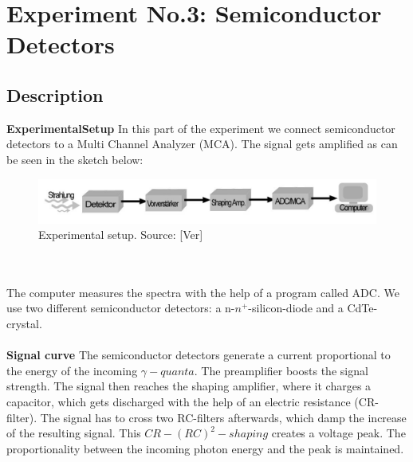 \chapter{Experiment No.3: Semiconductor Detectors}
\section{Description}
\textbf{ExperimentalSetup}
In this part of the experiment we connect semiconductor detectors to a Multi Channel Analyzer (MCA). The signal gets amplified as can be seen in the sketch below:\\
\begin{figure}[h]
\begin{center}
\includegraphics[scale=0.3]{Bilder/Aufbau_V3.png}\caption{Experimental setup. Source: [Ver]}\label{Halbleiterdetektor}
\end{center}
\end{figure}\\
\\
The computer measures the spectra with the help of a program called ADC. We use two different semiconductor detectors: a n-$n^{+}$-silicon-diode and a CdTe-crystal.\\
\\
\large\textbf{Signal curve}
The semiconductor detectors generate a current proportional to the energy of the incoming $\gamma-quanta$. The preamplifier boosts the signal strength. The signal then reaches the shaping amplifier, where it charges a capacitor, which gets discharged with the help of an electric resistance (CR-filter). The signal has to cross two RC-filters afterwards, which damp the increase of the resulting signal. This $CR-(RC)^2-shaping$ creates a voltage peak. The proportionality between the incoming photon energy and the peak is maintained.\\
\\
